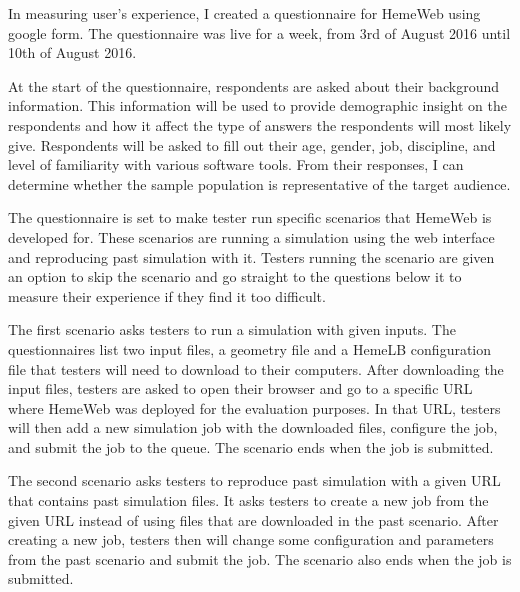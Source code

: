 In measuring user's experience, I created a questionnaire for HemeWeb using google form. The questionnaire was live for a week, from 3rd of August 2016 until 10th of August 2016.


At the start of the questionnaire, respondents are asked about their background information. This information will be used to provide demographic insight on the respondents and how it affect the type of answers the respondents will most likely give. Respondents will be asked to fill out their age, gender, job, discipline, and level of familiarity with various software tools. From their responses, I can determine whether the sample population is representative of the target audience.


The questionnaire is set to make tester run specific scenarios that HemeWeb is developed for. These scenarios are running a simulation using the web interface and reproducing past simulation with it. Testers running the scenario are given an option to skip the scenario and go straight to the questions below it to measure their experience if they find it too difficult. 

The first scenario asks testers to run a simulation with given inputs. The questionnaires list two input files, a geometry file and a HemeLB configuration file that testers will need to download to their computers. After downloading the input files, testers are asked to open their browser and go to a specific URL where HemeWeb was deployed for the evaluation purposes. In that URL, testers will then add a new simulation job with the downloaded files, configure the job, and submit the job to the queue. The scenario ends when the job is submitted.

The second scenario asks testers to reproduce past simulation with a given URL that contains past simulation files. It asks testers to create a new job from the given URL instead of using files that are downloaded in the past scenario. After creating a new job, testers then will change some configuration and parameters from the past scenario and submit the job. The scenario also ends when the job is submitted.

